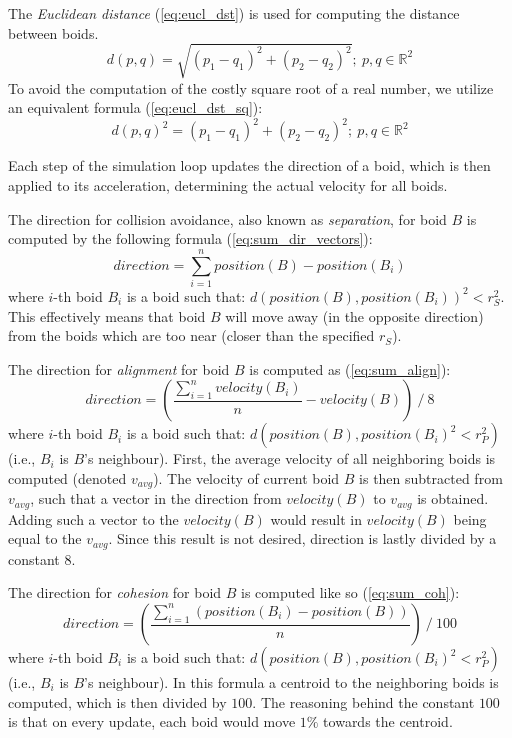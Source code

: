\documentclass[9pt]{pnas-new}
\begin{document}
\noindent The {\em Euclidean distance} (\ref{eq:eucl_dst}) is used for computing the distance between boids.
\begin{equation} \label{eq:eucl_dst}
	d(p, q) = \sqrt{(p_1-q_1)^2 + (p_2 - q_2)^2};\  p, q \in \mathbb{R}^2
\end{equation}
To avoid the computation of the costly square root of a real number, we utilize an equivalent formula
(\ref{eq:eucl_dst_sq}):
\begin{equation} \label{eq:eucl_dst_sq}
	d(p, q)^2 = (p_1-q_1)^2 + (p_2 - q_2)^2;\  p, q \in \mathbb{R}^2
\end{equation}

Each step of the simulation loop updates the direction of a boid, which is then applied to its acceleration,
determining the actual velocity for all boids.

The direction for collision avoidance, also known as {\em separation}, for boid $B$ is computed by the
following formula (\ref{eq:sum_dir_vectors}):
\begin{equation} \label{eq:sum_dir_vectors}
	direction = \sum_{i=1}^{n} position(B) - position(B_i)
\end{equation}
where $i$-th boid $B_i$ is a boid such that: $ d(position(B), position(B_i))^2 < r_S^2 $.
This effectively means that boid $B$ will move away (in the opposite direction) from the boids which are too near (closer than the specified $r_S$).

The direction for {\em alignment} for boid $B$ is computed as (\ref{eq:sum_align}):
\begin{equation} \label{eq:sum_align}
	direction = \left( \frac{\sum_{i=1}^{n} velocity(B_i)}{n} - velocity(B) \right) \mathbin{/} 8
\end{equation}
where $i$-th boid $B_i$ is a boid such that: $ d(position(B), position(B_i)^2 < r_P^2) $ (i.e., $B_i$ is $B$'s neighbour).
First, the average velocity of all neighboring boids is computed (denoted $v_{avg}$).
The velocity of current boid $B$ is then subtracted from $v_{avg}$, such that a vector in the direction
from $velocity(B)$ to $v_{avg}$ is obtained.
Adding such a vector to the $velocity(B)$ would result in $velocity(B)$ being equal to the $v_{avg}$.
Since this result is not desired, direction is lastly divided by a constant $8$.

The direction for {\em cohesion} for boid $B$ is computed like so (\ref{eq:sum_coh}):
\begin{equation} \label{eq:sum_coh}
	direction = \left( \frac{\sum_{i=1}^{n} \left(position(B_i) - position(B)\right)}{n} \right) \mathbin{/} 100
\end{equation}
where $i$-th boid $B_i$ is a boid such that: $ d(position(B), position(B_i)^2 < r_P^2) $ (i.e., $B_i$ is $B$'s neighbour).
In this formula a centroid to the neighboring boids is computed, which is then divided by $100$.
The reasoning behind the constant $100$ is that on every update, each boid would move $1\%$ towards the centroid.
\bigskip
\end{document}
